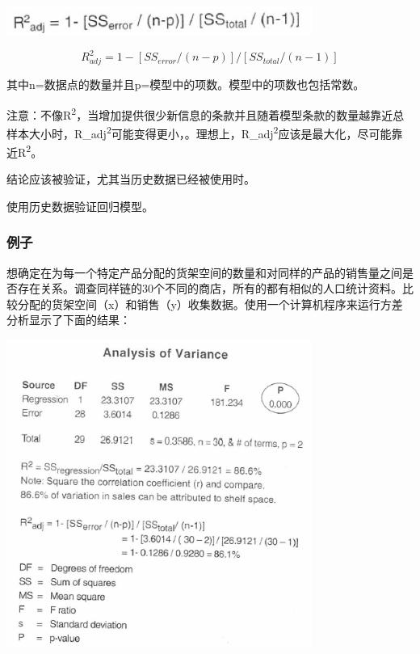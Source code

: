 
\includegraphics[width=10cm]{相关性11.png}

\[{R}_{adj}^2 = 1 - [{SS}_{error} / (n - p)] / [{SS}_{total} / (n - 1)]\]

其中n=数据点的数量并且p=模型中的项数。模型中的项数也包括常数。

注意：不像R\textsuperscript{2}，当增加提供很少新信息的条款并且随着模型条款的数量越靠近总样本大小时，R\_adj\textsuperscript{2}可能变得更小，。理想上，R\_adj\textsuperscript{2}应该是最大化，尽可能靠近R\textsuperscript{2}。

结论应该被验证，尤其当历史数据已经被使用时。

使用历史数据验证回归模型。


\hypertarget{ux80ccux666f}{%
\subsubsection{例子}\label{ux80ccux666f}}

想确定在为每一个特定产品分配的货架空间的数量和对同样的产品的销售量之间是否存在关系。调查同样链的30个不同的商店，所有的都有相似的人口统计资料。比较分配的货架空间（x）和销售（y）收集数据。使用一个计算机程序来运行方差分析显示了下面的结果：


\includegraphics[width=10cm]{相关性12.png}

